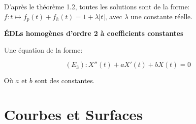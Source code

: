 \documentclass{article}
\begin{document}
D'après le théorème 1.2, toutes les solutions sont de la forme: $f : t \mapsto f_{p}(t) + f_{h}(t) = 1 + \lambda |t|$, avec $\lambda$ une constante réelle.




\begin{tcolorbox}[colback=gray!5!white,colframe=gray!75!black,title=Rappel 1.3]

\textbf{ÉDLs homogènes d'ordre 2 à coefficients constantes}

Une équation de la forme:

\[
(E_{3}) : X''(t) + aX'(t) + bX(t)= 0
\] 

Où $a$ et $b$ sont des constantes.

\end{tcolorbox}











\newpage
\part{Courbes et Surfaces}
\end{document}
